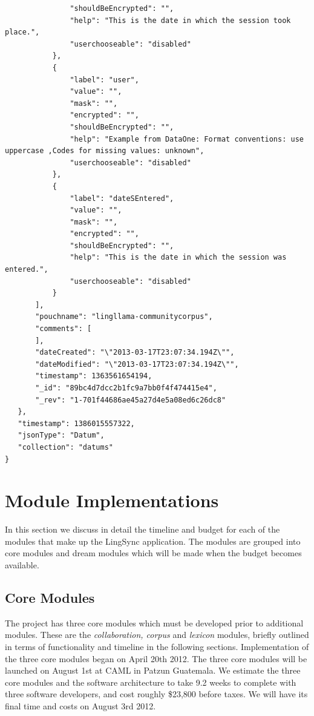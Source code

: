 \documentclass[12pt]{article}
\begin{document}
\begin{verbatim}
               "shouldBeEncrypted": "",
               "help": "This is the date in which the session took place.",
               "userchooseable": "disabled"
           },
           {
               "label": "user",
               "value": "",
               "mask": "",
               "encrypted": "",
               "shouldBeEncrypted": "",
               "help": "Example from DataOne: Format conventions: use uppercase ,Codes for missing values: unknown",
               "userchooseable": "disabled"
           },
           {
               "label": "dateSEntered",
               "value": "",
               "mask": "",
               "encrypted": "",
               "shouldBeEncrypted": "",
               "help": "This is the date in which the session was entered.",
               "userchooseable": "disabled"
           }
       ],
       "pouchname": "lingllama-communitycorpus",
       "comments": [
       ],
       "dateCreated": "\"2013-03-17T23:07:34.194Z\"",
       "dateModified": "\"2013-03-17T23:07:34.194Z\"",
       "timestamp": 1363561654194,
       "_id": "89bc4d7dcc2b1fc9a7bb0f4f474415e4",
       "_rev": "1-701f44686ae45a27d4e5a08ed6c26dc8"
   },
   "timestamp": 1386015557322,
   "jsonType": "Datum",
   "collection": "datums"
}
\end{verbatim}


\section{Module Implementations}

In this section we discuss in detail the timeline and budget for each of the modules that make up the LingSync application. The modules are grouped into core modules and dream modules which will be made when the budget becomes available. 

\label{sec:modules}
\subsection{Core Modules}

The project has three core modules which must be developed prior to additional modules. These are the {\it collaboration, corpus} and {\it lexicon} modules, briefly outlined in terms of functionality and timeline in the following sections.  Implementation of the three core modules began on April 20th 2012. The three core modules will be launched on August 1st at CAML in Patzun Guatemala. We estimate the three core modules and the software architecture to take 9.2 weeks to complete with three software developers,  and cost roughly \$23,800 before taxes. We will have its final time and costs on August 3rd 2012.
\end{document}
